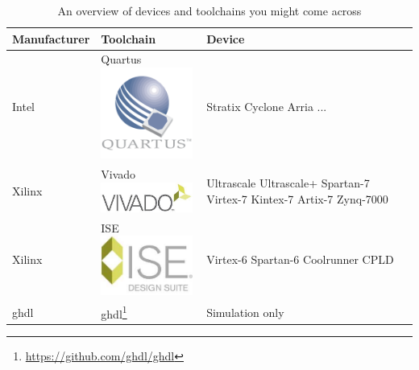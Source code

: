 \documentclass[11pt,a4paper]{article}
\begin{document}
\begin{table}
    \begin{center}
        \begin{tabular}{| m{4cm} | m{4cm} | m{4cm} |}
            \hline
            Manufacturer & Toolchain & Device \\ \hline
            Intel & Quartus \newline \includegraphics[width=30mm]{./src/quartus_logo.png} & Stratix \newline Cyclone \newline Arria \newline ... \\ \hline
            Xilinx & Vivado \newline  \includegraphics[width=30mm]{./src/vivado_logo.jpg} & Ultrascale \newline Ultrascale+ \newline Spartan-7 \newline Virtex-7 \newline Kintex-7 \newline Artix-7 \newline Zynq-7000 \\ \hline
            Xilinx & ISE \newline \includegraphics[width=30mm]{./src/ise_logo.jpg} & Virtex-6 \newline Spartan-6 \newline Coolrunner CPLD \\ \hline
            ghdl & ghdl\footnote{\url{https://github.com/ghdl/ghdl}} & Simulation only \\ \hline
        \end{tabular}
        \caption{An overview of devices and toolchains you might come across}
        \label{table:devices}
    \end{center}
\end{table}
\end{document}
